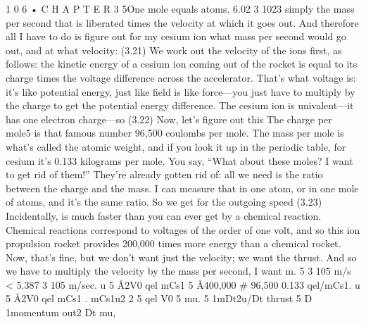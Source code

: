 \documentclass[10pt,oneside]{article}
\begin{document}
1 0 6 • C H A P T E R  3 5One mole equals atoms. 6.02 3 1023 simply the mass per second that is liberated times the velocity at which it goes out. And therefore all I have to do is figure out for my cesium ion what mass per second would go out, and at what velocity: (3.21) We work out the velocity of the ions first, as follows: the kinetic energy of a cesium ion coming out of the rocket is equal to its charge times the voltage difference across the accelerator. That’s what voltage is: it’s like potential energy, just like field is like force---you just have to multiply by the charge to get the potential energy difference. The cesium ion is univalent---it has one electron charge---so (3.22) Now, let’s figure out this The charge per mole5 is that famous number 96,500 coulombs per mole. The mass per mole is what’s called the atomic weight, and if you look it up in the periodic table, for cesium it’s 0.133 kilograms per mole. You say, “What about these moles? I want to get rid of them!” They’re already gotten rid of: all we need is the ratio between the charge and the mass. I can measure that in one atom, or in one mole of atoms, and it’s the same ratio. So we get for the outgoing speed (3.23) Incidentally, is much faster than you can ever get by a chemical reaction. Chemical reactions correspond to voltages of the order of one volt, and so this ion propulsion rocket provides 200,000 times more energy than a chemical rocket. Now, that’s fine, but we don’t want just the velocity; we want the thrust. And so we have to multiply the velocity by the mass per second, I want m. 5 3 105 m/s < 5.387 3 105 m/sec. u 5 Å2V0 qel mCs1 5 Å400,000 \# 96,500 0.133 qel/mCs1. u 5 Å2V0 qel mCs1 . mCs1u2 2 5 qel V0 5 mu. 5 1mDt2u/Dt thrust 5 D 1momentum out2 Dt mu,\par
\end{document}
